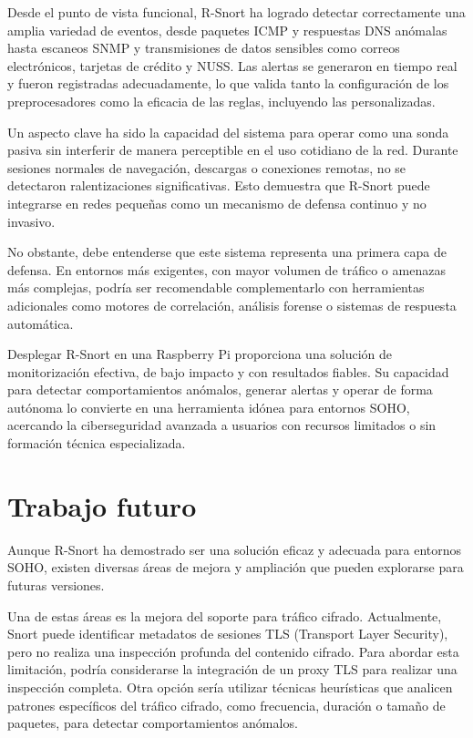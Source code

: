 \documentclass[11pt,a4paper,twoside]{report}
\begin{document}
Desde el punto de vista funcional, R-Snort ha logrado detectar correctamente una amplia variedad de eventos, desde paquetes ICMP y respuestas DNS anómalas hasta escaneos SNMP y transmisiones de datos sensibles como correos electrónicos, tarjetas de crédito y NUSS. Las alertas se generaron en tiempo real y fueron registradas adecuadamente, lo que valida tanto la configuración de los preprocesadores como la eficacia de las reglas, incluyendo las personalizadas.\newline

Un aspecto clave ha sido la capacidad del sistema para operar como una sonda pasiva sin interferir de manera perceptible en el uso cotidiano de la red. Durante sesiones normales de navegación, descargas o conexiones remotas, no se detectaron ralentizaciones significativas. Esto demuestra que R-Snort puede integrarse en redes pequeñas como un mecanismo de defensa continuo y no invasivo.\newline

No obstante, debe entenderse que este sistema representa una primera capa de defensa. En entornos más exigentes, con mayor volumen de tráfico o amenazas más complejas, podría ser recomendable complementarlo con herramientas adicionales como motores de correlación, análisis forense o sistemas de respuesta automática.\newline

Desplegar R-Snort en una Raspberry Pi proporciona una solución de monitorización efectiva, de bajo impacto y con resultados fiables. Su capacidad para detectar comportamientos anómalos, generar alertas y operar de forma autónoma lo convierte en una herramienta idónea para entornos SOHO, acercando la ciberseguridad avanzada a usuarios con recursos limitados o sin formación técnica especializada.


\section{Trabajo futuro}

Aunque R-Snort ha demostrado ser una solución eficaz y adecuada para entornos SOHO, existen diversas áreas de mejora y ampliación que pueden explorarse para futuras versiones.\newline

Una de estas áreas es la mejora del soporte para tráfico cifrado. Actualmente, Snort puede identificar metadatos de sesiones TLS (Transport Layer Security), pero no realiza una inspección profunda del contenido cifrado. Para abordar esta limitación, podría considerarse la integración de un proxy TLS para realizar una inspección completa. Otra opción sería utilizar técnicas heurísticas que analicen patrones específicos del tráfico cifrado, como frecuencia, duración o tamaño de paquetes, para detectar comportamientos anómalos.\newline
\end{document}
